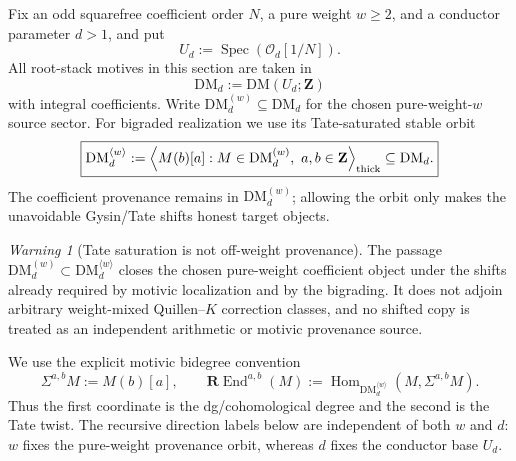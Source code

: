\documentclass[11pt]{article}
\theoremstyle{remark}
\newtheorem{warning}[theorem]{Warning}
\newcommand{\Z}{\mathbf Z}
\newcommand{\Spec}{\operatorname{Spec}}
\newcommand{\REnd}{\mathbf R\!\operatorname{End}}
\newcommand{\DM}{\mathrm{DM}}
\begin{document}
Fix an odd squarefree coefficient order $N$, a pure weight $w\ge2$, and a
conductor parameter $d>1$, and put
\begin{equation}
 \boxed{U_d:=\Spec(\mathcal O_d[1/N]).}
\end{equation}
All root-stack motives in this section are taken in
\begin{equation}
 \boxed{\DM_d:=\DM(U_d;\Z)}
\end{equation}
with integral coefficients.  Write $\DM_d^{(w)}\subseteq\DM_d$ for the
chosen pure-weight-\(w\) source sector.  For
bigraded realization we use its Tate-saturated stable orbit
\begin{equation}\label{P2M-eq:v42-tate-saturated-weight-orbit}
 \boxed{
 \DM_d^{\langle w\rangle}
 :=\left\langle M(b)[a]:M\in\DM_d^{(w)},\ a,b\in\Z\right\rangle_{\rm thick}
 \subseteq\DM_d.}
\end{equation}
The coefficient provenance remains in $\DM_d^{(w)}$; allowing the orbit only
makes the unavoidable Gysin/Tate shifts honest target objects.

\begin{warning}[Tate saturation is not off-weight provenance]
\label{P2M-warn:tate-saturation-not-new-provenance}
The passage $\DM_d^{(w)}\subset\DM_d^{\langle w\rangle}$ closes the chosen
pure-weight coefficient object under the shifts already required by motivic
localization and by the bigrading.  It does not adjoin arbitrary weight-mixed
Quillen--$K$ correction classes, and no shifted copy is treated as an
independent arithmetic or motivic provenance source.
\end{warning}

We use the
explicit motivic bidegree convention
\begin{equation}\label{P2M-eq:v32-bisuspension-convention}
 \boxed{
 \Sigma^{a,b}M:=M(b)[a],
 \qquad
 \REnd^{a,b}(M):=
 \operatorname{Hom}_{\DM_d^{\langle w\rangle}}(M,\Sigma^{a,b}M).}
\end{equation}
Thus the first coordinate is the dg/cohomological degree and the second is the
Tate twist.  The recursive direction labels below are independent of both
$w$ and $d$: $w$ fixes the pure-weight provenance orbit, whereas $d$ fixes the
conductor base $U_d$.
\end{document}

